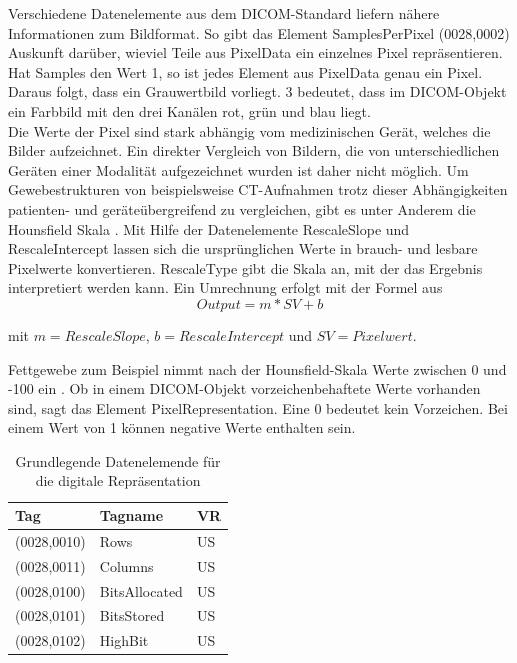 Verschiedene Datenelemente aus dem DICOM-Standard liefern nähere Informationen zum Bildformat. So gibt das Element SamplesPerPixel (0028,0002) Auskunft darüber, wieviel Teile aus PixelData ein einzelnes Pixel repräsentieren. Hat Samples den Wert 1, so ist jedes Element aus PixelData genau ein Pixel. Daraus folgt, dass ein Grauwertbild vorliegt. 3 bedeutet, dass im DICOM-Objekt ein Farbbild mit den drei Kanälen rot, grün und blau liegt.\\
Die Werte der Pixel sind stark abhängig vom medizinischen Gerät, welches die Bilder aufzeichnet. Ein direkter Vergleich von Bildern, die von unterschiedlichen Geräten einer Modalität aufgezeichnet wurden ist daher nicht möglich. Um Gewebestrukturen von beispielsweise CT-Aufnahmen trotz dieser Abhängigkeiten patienten- und geräteübergreifend zu vergleichen, gibt es unter Anderem die Hounsfield Skala \cite[2.1.3]{handels:mbv}. Mit Hilfe der Datenelemente RescaleSlope und RescaleIntercept lassen sich die ursprünglichen Werte in brauch- und lesbare Pixelwerte konvertieren. RescaleType gibt die Skala an, mit der das Ergebnis interpretiert werden kann. Ein Umrechnung erfolgt mit der Formel aus \cite[C.11-1b Seite 1168]{dicom:iod}\\

\begin{equation}
Output=m*SV+b
\label{rescale}
\end{equation}

mit $m = RescaleSlope$, $b = RescaleIntercept$ und $SV=Pixelwert$.

Fettgewebe zum Beispiel nimmt nach der Hounsfield-Skala Werte zwischen 0 und -100 ein \cite[Abbildung 1.18 Seite 15]{radio:hounsfield}. Ob in einem DICOM-Objekt vorzeichenbehaftete Werte vorhanden sind, sagt das Element PixelRepresentation. Eine 0 bedeutet kein Vorzeichen. Bei einem Wert von 1 können negative Werte enthalten sein.
\begin{table}
    \begin{tabularx}{\textwidth}{|X|X|X|}
    \toprule
    \hline
    \textbf{Tag}         & \textbf{Tagname}     & \textbf{VR} \\ \hline
    (0028,0010) 		 & Rows					& US 		  \\ \hline
    (0028,0011) 		 & Columns				& US 		  \\ \hline
    (0028,0100) 		 & BitsAllocated		& US 		  \\ \hline
    (0028,0101) 		 & BitsStored			& US 		  \\ \hline
    (0028,0102)			 & HighBit				& US 		  \\ \hline
    \bottomrule
    \end{tabularx}
    \caption {Grundlegende Datenelemende für die digitale Repräsentation}
    \label{table:digitalRep}
\end{table}

